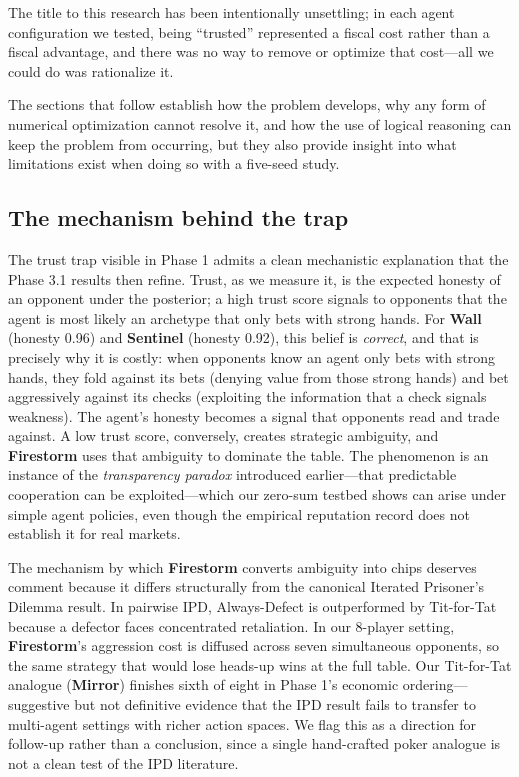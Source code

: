 \documentclass[10pt]{article} %
\newcommand{\arch}[1]{\textbf{#1}}
\begin{document}
The title to this research has been intentionally unsettling; in
each agent configuration we tested, being ``trusted'' represented a
fiscal cost rather than a fiscal advantage, and there was no way to
remove or optimize that cost---all we could do was rationalize it.

The sections that follow establish how the problem develops, why any
form of numerical optimization cannot resolve it, and how the use of
logical reasoning can keep the problem from occurring, but they also
provide insight into what limitations exist when doing so with a
five-seed study.

\subsection{The mechanism behind the trap}
The trust trap visible in Phase 1 admits a clean mechanistic
explanation that the Phase 3.1 results then refine. Trust, as we
measure it, is the expected honesty of an opponent under the
posterior; a high trust score signals to opponents that the agent
is most likely an archetype that only bets with strong hands. For
\arch{Wall} (honesty 0.96) and \arch{Sentinel} (honesty 0.92),
this belief is \textit{correct}, and that is precisely why it is
costly: when opponents know an agent only bets with strong hands,
they fold against its bets (denying value from those strong
hands) and bet aggressively against its checks (exploiting the
information that a check signals weakness). The agent's honesty
becomes a signal that opponents read and trade against. A low
trust score, conversely, creates strategic ambiguity, and
\arch{Firestorm} uses that ambiguity to dominate the table. The
phenomenon is an instance of the \textit{transparency paradox}
introduced earlier---that predictable cooperation can be
exploited---which our zero-sum testbed shows can arise under simple
agent policies, even though the empirical reputation record does not
establish it for real markets.

The mechanism by which \arch{Firestorm} converts ambiguity into
chips deserves comment because it differs structurally from the
canonical Iterated Prisoner's Dilemma result. In pairwise IPD,
Always-Defect is outperformed by Tit-for-Tat because a defector
faces concentrated retaliation. In our 8-player setting,
\arch{Firestorm}'s aggression cost is diffused across seven
simultaneous opponents, so the same strategy that would lose
heads-up wins at the full table. Our Tit-for-Tat analogue
(\arch{Mirror}) finishes sixth of eight in Phase 1's economic ordering---
suggestive but not definitive evidence that the IPD result fails
to transfer to multi-agent settings with richer action spaces. We
flag this as a direction for follow-up rather than a conclusion,
since a single hand-crafted poker analogue is not a clean test of
the IPD literature.
\end{document}
